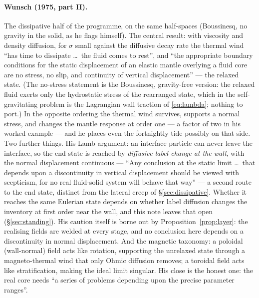 \documentclass[11pt]{article}
\theoremstyle{definition}
\theoremstyle{remark}
\begin{document}
\paragraph{Wunsch (1975, part II).} The dissipative half of the
programme, on the same half-spaces (Boussinesq, no gravity in the
solid, as he flags himself). The central result: with viscosity and
density diffusion, for $\sigma$ small against the diffusive decay rate
the thermal wind ``has time to dissipate \ldots\ the fluid comes to
rest'', and ``the appropriate boundary conditions for the static
displacement of an elastic mantle overlying a fluid core are no
stress, no slip, and continuity of vertical displacement'' --- the
relaxed state. (The no-stress statement is the Boussinesq, gravity-free
version: the relaxed fluid exerts only the hydrostatic stress of the
rearranged state, which in the self-gravitating problem is the
Lagrangian wall traction of \eqref{eq:lambda}; nothing to port.) In
the opposite ordering the thermal wind survives, supports a normal
stress, and changes the mantle response at order one --- a factor of
two in his worked example --- and he places even the fortnightly tide
possibly on that side. Two further things. His Lamb argument: an
interface particle can never leave the interface, so the end state is
reached by \emph{diffusive label change at the wall}, with the normal
displacement continuous --- ``Any conclusion at the static limit
\ldots\ that depends upon a discontinuity in vertical displacement
should be viewed with scepticism, for no real fluid-solid system will
behave that way'' --- a second route to the end state, distinct from
the lateral creep of \S\ref{sec:dissipative}. Whether it reaches the
same Eulerian state depends on
whether label diffusion changes the inventory at first order near the
wall, and this note leaves that open (\S\ref{sec:standing}). His
caution itself is borne out by Proposition~\ref{prop:layer}: the
realising fields are welded at every stage, and no conclusion here
depends on a discontinuity in normal displacement.
And the magnetic taxonomy: a poloidal (wall-normal) field acts like
rotation, supporting the unrelaxed state through a magneto-thermal
wind that only Ohmic diffusion removes; a toroidal field acts like
stratification, making the ideal limit singular. His close is the
honest one: the real core needs ``a series of problems depending upon
the precise parameter ranges''.
\end{document}
